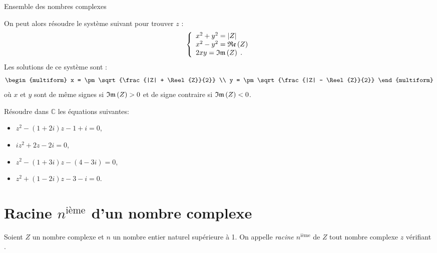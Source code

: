 \begin{chapter}{Ensemble des nombres complexes}
\begin{methode}
      On peut alors r\'esoudre le syst\`eme suivant pour trouver $z$ :
            \[
                  \left\lbrace
                        \begin{array}{l}
                              x^2 + y^2 = |Z|           \\
                              x^2 - y^2 = \mathfrak{Re}\left(Z\right)      \\
                              2 x y     = \mathfrak{Im}\left(Z\right)      \;.
                        \end{array}
                  \right. 
            \]
      Les solutions de ce syst\`eme sont :
			\[
				\begin{multiform}
					x = \pm \sqrt{\frac{|Z| + \Reel{Z}}{2}}		\\
					y = \pm \sqrt{\frac{|Z| - \Reel{Z}}{2}}		
				\end{multiform}
			\]
			o\`u $x$ et $y$ sont de m\^eme signes si $\mathfrak{Im}\left(Z\right) > 0$ et de signe contraire si $\mathfrak{Im}\left(Z\right) < 0$.
\end{methode}
%
\begin{exe}
\label{exe:second degre complexe}
      R\'esoudre dans $\mathbb{C}$ les \'equations suivantes: 
      \begin{itemize}
            \item $z^2 - (1 + 2i) z - 1 + i = 0$,
            \item $i z^2 + 2 z - 2 i = 0$,
            \item $z^2 - (1+3i) z - (4 - 3i) = 0$,
            \item $z^2 + (1-2i) z - 3 - i = 0$.
      \end{itemize}
\end{exe}

\section{Racine $n^{\text{i\`eme}}$ d'un nombre complexe}
%
\begin{defi}
      Soient $Z$ un nombre complexe et $n$ un nombre entier naturel sup\'erieure \`a 1.
      On appelle \emph{racine $n^{\text{i\`eme}}$} de $Z$ tout nombre complexe $z$ v\'erifiant
            .
\end{defi}
%

\end{chapter}
